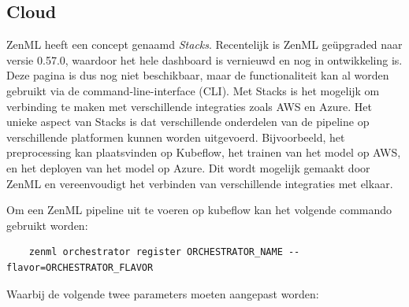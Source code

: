 \subsection{Cloud}
ZenML heeft een concept genaamd \textit{Stacks}. Recentelijk is ZenML geüpgraded naar versie 0.57.0, waardoor het hele dashboard is vernieuwd en nog in ontwikkeling is. Deze pagina is dus nog niet beschikbaar, maar de functionaliteit kan al worden gebruikt via de command-line-interface (CLI).
Met Stacks is het mogelijk om verbinding te maken met verschillende integraties zoals AWS en Azure. Het unieke aspect van Stacks is dat verschillende onderdelen van de pipeline op verschillende platformen kunnen worden uitgevoerd. Bijvoorbeeld, het preprocessing kan plaatsvinden op Kubeflow, het trainen van het model op AWS, en het deployen van het model op Azure. Dit wordt mogelijk gemaakt door ZenML en vereenvoudigt het verbinden van verschillende integraties met elkaar.

Om een ZenML pipeline uit te voeren op kubeflow kan het volgende commando gebruikt worden:
\begin{verbatim}
    zenml orchestrator register ORCHESTRATOR_NAME --flavor=ORCHESTRATOR_FLAVOR
\end{verbatim}
Waarbij de volgende twee parameters moeten aangepast worden:

